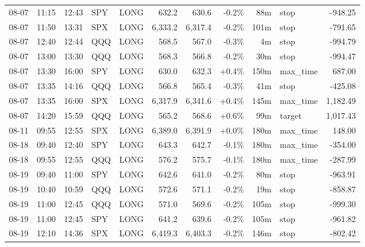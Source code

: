 \documentclass[11pt,a4paper,twoside]{article}
\begin{document}
\begin{center}
\begin{longtable}{>{\color{txtmain}}l l l l l r r r r >{\color{txtmain}}l r}
08-07 & 11:15 & 12:43 & SPY & LONG & 632.2 & 630.6 & \textcolor{lossred}{-0.2\%} & 88m & stop & \textcolor{lossred}{-948.25} \\
08-07 & 11:50 & 13:31 & SPX & LONG & 6,333.2 & 6,317.4 & \textcolor{lossred}{-0.2\%} & 101m & stop & \textcolor{lossred}{-791.65} \\
08-07 & 12:40 & 12:44 & QQQ & LONG & 568.5 & 567.0 & \textcolor{lossred}{-0.3\%} & 4m & stop & \textcolor{lossred}{-994.79} \\
08-07 & 13:00 & 13:30 & QQQ & LONG & 568.3 & 566.8 & \textcolor{lossred}{-0.2\%} & 30m & stop & \textcolor{lossred}{-994.47} \\
08-07 & 13:30 & 16:00 & SPY & LONG & 630.0 & 632.3 & \textcolor{wingreen}{+0.4\%} & 150m & max\_time & \textcolor{wingreen}{687.00} \\
08-07 & 13:35 & 14:16 & QQQ & LONG & 566.8 & 565.4 & \textcolor{lossred}{-0.3\%} & 41m & stop & \textcolor{lossred}{-425.08} \\
08-07 & 13:35 & 16:00 & SPX & LONG & 6,317.9 & 6,341.6 & \textcolor{wingreen}{+0.4\%} & 145m & max\_time & \textcolor{wingreen}{1,182.49} \\
08-07 & 14:20 & 15:59 & QQQ & LONG & 565.2 & 568.6 & \textcolor{wingreen}{+0.6\%} & 99m & target & \textcolor{wingreen}{1,017.43} \\
08-11 & 09:55 & 12:55 & SPX & LONG & 6,389.0 & 6,391.9 & \textcolor{wingreen}{+0.0\%} & 180m & max\_time & \textcolor{wingreen}{148.00} \\
08-18 & 09:40 & 12:40 & SPY & LONG & 643.3 & 642.7 & \textcolor{lossred}{-0.1\%} & 180m & max\_time & \textcolor{lossred}{-354.00} \\
08-18 & 09:55 & 12:55 & QQQ & LONG & 576.2 & 575.7 & \textcolor{lossred}{-0.1\%} & 180m & max\_time & \textcolor{lossred}{-287.99} \\
08-19 & 09:40 & 11:00 & SPY & LONG & 642.6 & 641.0 & \textcolor{lossred}{-0.2\%} & 80m & stop & \textcolor{lossred}{-963.91} \\
08-19 & 10:40 & 10:59 & QQQ & LONG & 572.6 & 571.1 & \textcolor{lossred}{-0.2\%} & 19m & stop & \textcolor{lossred}{-858.87} \\
08-19 & 11:00 & 12:45 & QQQ & LONG & 571.0 & 569.6 & \textcolor{lossred}{-0.2\%} & 105m & stop & \textcolor{lossred}{-999.30} \\
08-19 & 11:00 & 12:45 & SPY & LONG & 641.2 & 639.6 & \textcolor{lossred}{-0.2\%} & 105m & stop & \textcolor{lossred}{-961.82} \\
08-19 & 12:10 & 14:36 & SPX & LONG & 6,419.3 & 6,403.3 & \textcolor{lossred}{-0.2\%} & 146m & stop & \textcolor{lossred}{-802.42} \\

\end{longtable}
\end{center}
\end{document}

